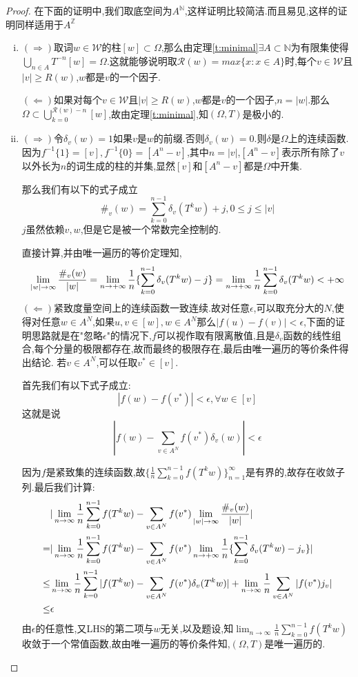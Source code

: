 \documentclass[a4paper,11pt,oneside]{book}
\begin{document}
\begin{proof}
在下面的证明中,我们取底空间为$A^{\mathbb{N}}$,这样证明比较简洁.而且易见,这样的证明同样适用于$A^{\mathbb{Z}}$
\begin{enumerate}[(i)]
\item $(\Rightarrow)$取词$w\in\mathcal{W}$的柱$[w]\subset \Omega$,那么由定理\ref{t:minimal}$\exists A\subset\mathbb{N}$为有限集使得$\bigcup_{n\in A} T^{-n}[w]=\Omega$.这就能够说明取$\mathcal{R}(w)=max\{x:x\in A\}$时,每个$v\in \mathcal{W}$且$|v|\geq R(w)$,$w$都是$v$的一个因子.

$(\Leftarrow)$如果对每个$v\in \mathcal{W}$且$|v|\geq R(w)$,$w$都是$v$的一个因子,$n=|w|$.那么$\Omega\subset \bigcup_{k=0}^{\mathcal{R}(w)-n}[w]$,故由定理\ref{t:minimal},知$(\Omega,T)$是极小的.
\item $(\Rightarrow)$令$\delta_v(w)=1$如果$v$是$w$的前缀.否则$\delta_v(w)=0$.则$\delta$是$\Omega$上的连续函数.因为$f^{-1}\{1\}=[v],f^{-1}\{0\}=[A^{n}-v]$,其中$n=|v|$,$[A^{n}-v]$表示所有除了$v$以外长为$n$的词生成的柱的并集,显然$[v]$和$[A^{n}-v]$都是$\Omega$中开集.

那么我们有以下的式子成立$$\#_v(w)=\sum_{k=0}^{n-1}\delta_v(T^kw)+j,0\leq j\leq |v|$$
$j$虽然依赖$v,w$,但是它是被一个常数完全控制的.

直接计算,并由唯一遍历的等价定理知,
$$
\lim_{|w| \to \infty}{\#_v(w)\over |w |}=\lim_{n\to +\infty}\frac{1}{n}\{\sum_{k=0}^{n-1}\delta_v(T^kw)-j\}=\lim_{n\to +\infty}\frac{1}{n}\sum_{k=0}^{n-1}\delta_v(T^kw)<+\infty
$$
$(\Leftarrow)$紧致度量空间上的连续函数一致连续.故对任意$\epsilon$,可以取充分大的$N$,使得对任意$w\in A^{N}$,如果$u,v\in [w],w\in A^{N}$那么$|f(u)-f(v)|<\epsilon$,下面的证明思路就是在"忽略$\epsilon$"的情况下,$f$可以视作取有限离散值,且是$\delta_v$函数的线性组合,每个分量的极限都存在,故而最终的极限存在,最后由唯一遍历的等价条件得出结论.
若$v\in A^N$,可以任取$v^*\in [v]$.

首先我们有以下式子成立:
$$|f(w)-f(v^*)|<\epsilon,\forall w\in [v]$$
这就是说$$|f(w)-\sum_{v\in A^N}f(v^*)\delta_v(w)|<\epsilon$$

因为$f$是紧致集的连续函数,故$\{\frac{1}{n}\sum_{k=0}^{n-1}f(T^kw)\}_{n=1}^\infty$是有界的,故存在收敛子列.最后我们计算:
\begin{align*}
&|\lim_{n\to \infty}\frac{1}{n}\sum_{k=0}^{n-1}f(T^kw)
-\sum_{v\in A^{N}}f(v^*)\lim_{|w| \to \infty}{\#_v(w)\over |w |}|\\
=&|\lim_{n\to \infty}\frac{1}{n}\sum_{k=0}^{n-1}f(T^kw)
-\sum_{v\in A^{N}}f(v^*)\lim_{n\to +\infty}\frac{1}{n}\{\sum_{k=0}^{n-1}\delta_v(T^kw)-j_v\}|\\
\leq&\lim_{n\to \infty}\frac{1}{n}\sum_{k=0}^{n-1}|f(T^kw)-\sum_{v\in A^N}f(v^*)\delta_v(T^kw)|+\lim_{n\to \infty}\frac{1}{n}\sum_{v\in A^N}|f(v^*)j_v|\\
\leq&\epsilon
\end{align*}
由$\epsilon$的任意性,又LHS的第二项与$w$无关,以及题设,知$\lim_{n\to \infty}\frac{1}{n}\sum_{k=0}^{n-1}f(T^kw)$收敛于一个常值函数,故由唯一遍历的等价条件知,$(\Omega,T)$是唯一遍历的.

\end{enumerate}
\end{proof}
\end{document}
